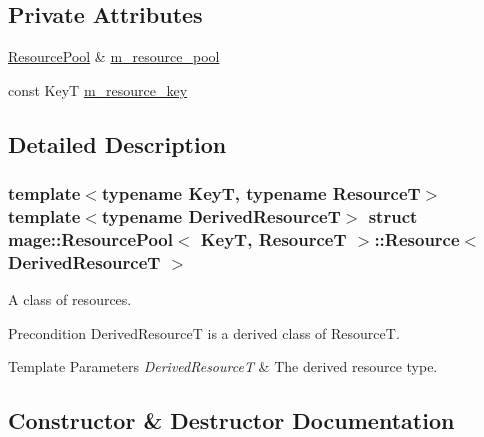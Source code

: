 \subsection*{Private Attributes}
\begin{DoxyCompactItemize}
\item 
\hyperlink{classmage_1_1_resource_pool}{Resource\+Pool} \& \hyperlink{structmage_1_1_resource_pool_1_1_resource_a9e5b68fd638ed6bd3b271afff834aced}{m\+\_\+resource\+\_\+pool}
\item 
const KeyT \hyperlink{structmage_1_1_resource_pool_1_1_resource_a7980e0160d7b3ff4fc70ec4deabb443c}{m\+\_\+resource\+\_\+key}
\end{DoxyCompactItemize}


\subsection{Detailed Description}
\subsubsection*{template$<$typename KeyT, typename ResourceT$>$\newline
template$<$typename Derived\+ResourceT$>$\newline
struct mage\+::\+Resource\+Pool$<$ Key\+T, Resource\+T $>$\+::\+Resource$<$ Derived\+Resource\+T $>$}

A class of resources.

\begin{DoxyPrecond}{Precondition}
{\ttfamily Derived\+ResourceT} is a derived class of {\ttfamily ResourceT}. 
\end{DoxyPrecond}

\begin{DoxyTemplParams}{Template Parameters}
{\em Derived\+ResourceT} & The derived resource type. \\
\hline
\end{DoxyTemplParams}


\subsection{Constructor \& Destructor Documentation}
\hypertarget{structmage_1_1_resource_pool_1_1_resource_a552bb997277371d36aa1bf2248d83f4f}{}\label{structmage_1_1_resource_pool_1_1_resource_a552bb997277371d36aa1bf2248d83f4f} 
